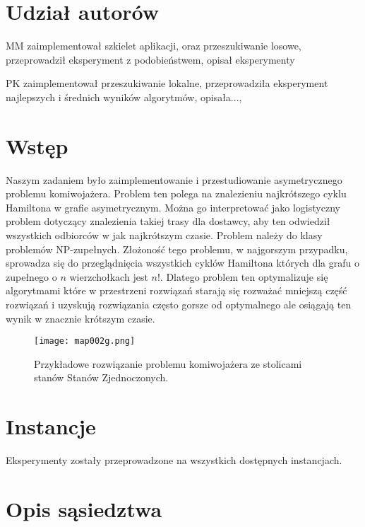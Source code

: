 \documentclass{article}
\begin{document}


\section*{Udział autorów}
\begin{tightlist}
    \item MM zaimplementował szkielet aplikacji, oraz przeszukiwanie losowe, przeprowadził eksperyment z podobieństwem, opisał eksperymenty
    \item PK zaimplementował przeszukiwanie lokalne, przeprowadziła eksperyment najlepszych i średnich wyników algorytmów, opisała...,
\end{tightlist}


\section{Wstęp}

Naszym zadaniem było zaimplementowanie i przestudiowanie asymetrycznego problemu komiwojażera. Problem ten polega na znalezieniu najkrótszego cyklu Hamiltona w grafie asymetrycznym. Można go interpretować jako logistyczny problem dotyczący znalezienia takiej trasy dla dostawcy, aby ten odwiedził wszystkich odbiorców w jak najkrótszym czasie. Problem należy do klasy problemów NP-zupełnych. Złożoność tego problemu, w najgorszym przypadku, sprowadza się do przeglądnięcia wszystkich cyklów Hamiltona których dla grafu o zupełnego o $n$ wierzchołkach jest $n!$. Dlatego problem ten optymalizuje się algorytmami które w przestrzeni rozwiązań starają się rozważać mniejszą część rozwiązań i uzyskują rozwiązania często gorsze od optymalnego ale osiągają ten wynik w znacznie krótszym czasie.

\begin{figure}[H]
\begin{center}
    \texttt{[image: map002g.png]}
\end{center}
\caption{Przykładowe rozwiązanie problemu komiwojażera ze stolicami stanów Stanów Zjednoczonych.}
\label{fig:schemat}
\end{figure}

\section{Instancje}

Eksperymenty zostały przeprowadzone na wszystkich dostępnych instancjach.

\section{Opis sąsiedztwa}
\end{document}
